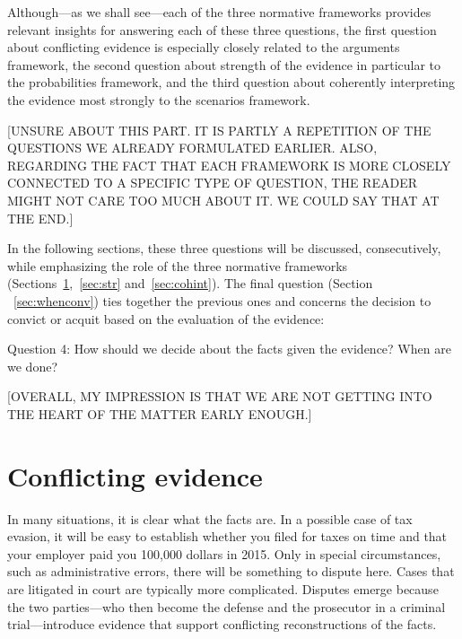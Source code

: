 \documentclass[10pt]{article}
\begin{document}
\noindent Although---as we shall see---each of the three normative frameworks provides relevant insights for answering each of these three questions, the first question about conflicting evidence is especially closely related to the arguments framework, the second question about strength of the evidence in particular to the probabilities framework, and the third question about coherently interpreting the evidence most strongly to the scenarios framework.

[UNSURE ABOUT THIS PART. IT IS PARTLY A REPETITION OF THE QUESTIONS WE ALREADY FORMULATED EARLIER. ALSO, REGARDING THE FACT THAT EACH 
FRAMEWORK IS MORE CLOSELY CONNECTED TO A SPECIFIC TYPE OF QUESTION, THE READER MIGHT NOT CARE TOO MUCH ABOUT IT. WE COULD SAY THAT AT THE END.]

In the following sections, these three questions will be discussed, consecutively, while emphasizing 
the role of the three normative frameworks (Sections~\ref{sec:conf},~\ref{sec:str} and~\ref{sec:cohint}). 
The final question (Section ~\ref{sec:whenconv}) ties together the previous ones 
and concerns the decision to convict or acquit based 
on the evaluation of the evidence:


\begin{description}
	\item Question 4: How should we decide about the facts given the evidence? When are we done?
\end{description}


[OVERALL, MY IMPRESSION  IS THAT WE ARE NOT GETTING 
INTO THE HEART OF THE MATTER EARLY ENOUGH.]


\section{Conflicting evidence}
\label{sec:conf}
 	

In many situations, it is clear what the facts are. In a possible case of tax evasion, it will be easy to establish whether you filed for taxes on time and that your employer paid you 100,000 dollars in 2015. Only in special circumstances, such as administrative errors, there will be something to dispute here. 
Cases that are litigated in court are typically more complicated.
Disputes emerge because the two parties---who then become the defense and the 
prosecutor in a criminal trial---introduce evidence that support conflicting 
reconstructions of the facts. 
\end{document}
